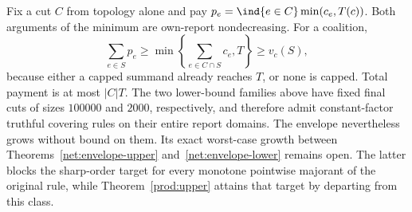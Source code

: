 \begin{remark}
\label{net:fixed-cut}
Fix a cut $C$ from topology alone and pay
$p_e=\ind\{e\in C\}\min(c_e,T(c))$.
Both arguments of the minimum are own-report nondecreasing.  For a coalition,
\[
 \sum_{e\in S}p_e\ge
 \min\left\{\sum_{e\in C\cap S}c_e,T\right\}\ge v_c(S),
\]
because either a capped summand already reaches $T$, or none is capped.
Total payment is at most $|C|T$.  The two lower-bound families above have
fixed final cuts of sizes $100000$ and $2000$, respectively, and therefore
admit constant-factor truthful covering rules on their entire report domains.
The envelope nevertheless grows without bound on them.  Its exact worst-case
growth between Theorems~\ref{net:envelope-upper} and~\ref{net:envelope-lower}
remains open.  The latter blocks the sharp-order target for every monotone
pointwise majorant of the original rule, while Theorem~\ref{prod:upper}
attains that target by departing from this class.
\end{remark}
